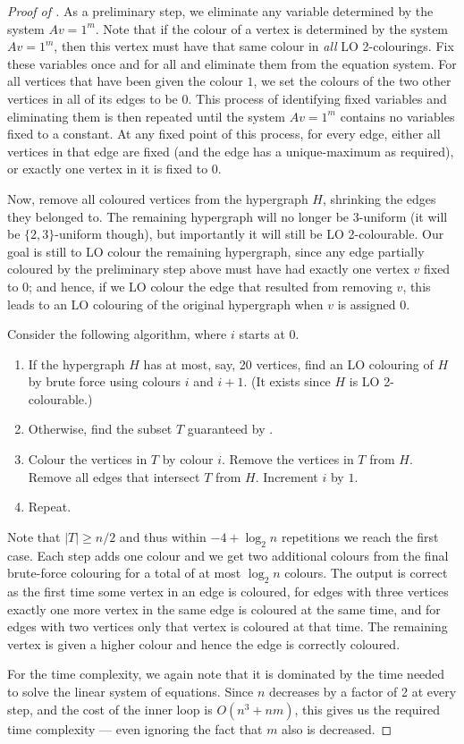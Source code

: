 \documentclass[a4paper,11pt]{article}
\theoremstyle{plain}
\theoremstyle{definition}
\begin{document}
\begin{proof}[Proof of ]
As a preliminary step, we eliminate any variable determined by the system $Av=1^m$. Note that if the colour of a vertex is determined by the system $Av=1^m$, then this vertex must have that same colour in \emph{all} LO 2-colourings. Fix these variables once and for all and eliminate them from the equation system.
For all vertices that have been given the colour $1$, we set the colours of the two other vertices in all of its edges to be $0$. This process of identifying fixed variables and eliminating them is then repeated until the system $Av=1^m$ contains no variables fixed to a constant. At any fixed point of this process, for every edge, either all vertices in that edge are fixed (and the edge has a unique-maximum as required), or exactly one vertex in it is fixed to 0. 

Now, remove all coloured vertices from the hypergraph $H$, shrinking the edges they belonged to. The remaining hypergraph will no longer be $3$-uniform (it will be $\{2, 3\}$-uniform though), but importantly it will still be LO 2-colourable. Our goal is still to LO colour the remaining hypergraph, since any edge partially coloured by the preliminary step above must have had exactly one vertex $v$ fixed to 0; and hence, if we LO colour the edge that resulted from removing $v$, this leads to an LO colouring of the original hypergraph when $v$ is assigned 0.

Consider the following algorithm, where $i$ starts at $0$.
\begin{enumerate}
    \item If the hypergraph $H$ has at most, say, 20  vertices, find an LO colouring of $H$ by brute force using colours $i$ and $i + 1$. (It exists since $H$ is LO 2-colourable.)
    \item Otherwise, find the subset $T$ guaranteed by .
    \item Colour the vertices in $T$ by colour $i$. Remove the vertices in $T$ from $H$. Remove all edges that intersect $T$ from $H$. Increment $i$ by $1$.
    \item Repeat.
\end{enumerate}
Note that $| T| \geq n / 2$ and thus within $-4 +  \log_2 n$ repetitions we reach the first case. Each step adds one colour and we get two additional
colours from the final brute-force colouring for a total of at most $\log_2 n$ colours.
The output is correct as the first time some vertex in an edge is coloured, for edges with three vertices exactly one more vertex in the same  edge is coloured at the same time, and for edges with two vertices only that vertex is coloured at that time. The remaining vertex is given a higher colour and hence the edge is correctly coloured.

For the time complexity, we again note that it is dominated by the time needed to solve the linear system of equations. Since $n$ decreases by a factor of 2 at every step, and the cost of the inner loop is $O(n^3 + nm)$, this gives us the required time complexity --- even ignoring the fact that $m$ also is decreased.
\end{proof}
\end{document}
